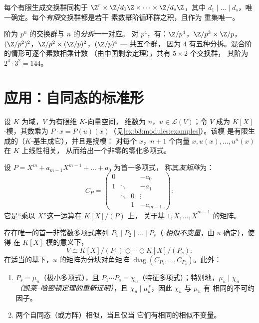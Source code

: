 \begin{corollary}[有限生成交换群]
\label{cor:b3:modules:abelian}
每个有限生成交换群同构于 $\Z^r \times
\Z/d_1\Z\times\dots\times\Z/d_s\Z$，其中 $d_1 \mid \dots \mid
d_s$，唯一确定。每个\emph{有限}交换群都是若干
素数幂阶循环群之积，且作为
重集唯一。
\end{corollary}

\begin{example}\label{ex:b3:modules:abelian}
阶为 $p^n$ 的交换群与 $n$ 的\emph{分拆}一一对应。
对 $p^4$，有：$\Z/p^4$，$\Z/p^3\times\Z/p$，
$(\Z/p^2)^2$，$\Z/p^2 \times (\Z/p)^2$，$(\Z/p)^4$ --- 共五个群，
因为 $4$ 有五种分拆。混合阶的情形可逐个素数相乘计数
（由中国剩余定理），共有 $5 \times 2$ 个交换群，
其阶为 $2^4 \cdot 3^2 = 144$。
\end{example}

\section{应用：自同态的标准形}

设 $K$ 为域，$V$ 为有限维 $K$-向量空间，
维数为 $n$，$u \in \mathcal L(V)$；令 $V$ 成为 $K[X]$-模，其数乘为 $P
\cdot x = P(u)(x)$（见\cref{ex:b3:modules:examples}）。该模
是有限生成的（$K$-基生成它），并且是挠模：
对每个 $x$，$n+1$ 个向量 $x, u(x), \dots, u^n(x)$ 在 $K$ 上线性相关，
从而给出一个非零的零化多项式。

\begin{definition}\label{def:b3:modules:companion}
设 $P = X^m + a_{m-1}X^{m-1} + \dots + a_0$ 为首一多项式，
称其\emph{友矩阵}为：
\[
C_P = \begin{pmatrix}
0 & & & -a_0\\
1 & \ddots & & -a_1\\
& \ddots & 0 & \vdots\\
& & 1 & -a_{m-1}
\end{pmatrix} :
\]
它是“乘以 $X$”这一运算在 $K[X]/(P)$ 上，
关于基 $1, \bar X, \dots, \bar X^{m-1}$ 的矩阵。
\end{definition}

\begin{theorem}
\label{thm:b3:modules:frobenius}
存在唯一的首一非常数多项式序列 $P_1
\mid P_2 \mid \dots \mid P_s$（
\emph{相似不变量}，由 $u$ 确定），使得
在 $K[X]$-模的意义下，
\[
V \cong K[X]/(P_1) \oplus \cdots \oplus K[X]/(P_s):
\]
在适当的基下，$u$ 的矩阵为分块对角矩阵
$\operatorname{diag}(C_{P_1}, \dots, C_{P_s})$。此外：
\begin{enumerate}
  \item $P_s = \mu_u$（极小多项式），且 $P_1\cdots P_s =
        \chi_u$（特征多项式）；特别地，$\mu_u
        \mid \chi_u$ \emph{（凯莱–哈密顿定理的重新证明）}，且
        $\chi_u \mid \mu_u^{\,s}$，因此 $\chi_u$ 与 $\mu_u$ 有
        相同的不可约因子。
  \item 两个自同态（或方阵）相似，当且仅当
        它们有相同的相似不变量。
\end{enumerate}
\end{theorem}

